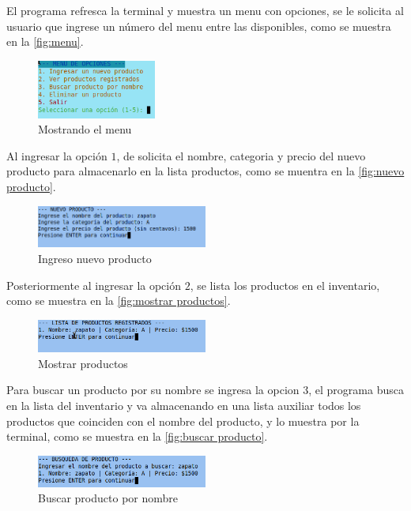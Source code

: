 \documentclass[12pt]{article}
\begin{document}
El programa refresca la terminal y muestra un menu con opciones, se le solicita al usuario que ingrese un número del menu entre las disponibles, como se muestra en la \autoref{fig:menu}.

\begin{figure}[H]
	\centering
	\setlength{\fboxrule}{0pt}
	\includegraphics[width=0.35\textwidth]{Imagenes/menu.png}
	\caption{Mostrando el menu}
	\label{fig:menu}
\end{figure} 

Al ingresar la opción $1$, de solicita el nombre, categoria y precio del nuevo producto para almacenarlo en la lista productos, como se muentra en la \autoref{fig:nuevo producto}.

\begin{figure}[H]
	\centering
	\setlength{\fboxrule}{0pt}
	\includegraphics[width=0.5\textwidth]{Imagenes/img2.png}
	\caption{Ingreso nuevo producto}
	\label{fig:nuevo producto}
\end{figure} 

Posteriormente al ingresar la opción $2$, se lista los productos en el inventario, como se muestra en la \autoref{fig:mostrar productos}.

\begin{figure}[H]
	\centering
	\setlength{\fboxrule}{0pt}
	\includegraphics[width=0.5\textwidth]{Imagenes/img3.png}
	\caption{Mostrar productos}
	\label{fig:mostrar productos}
\end{figure} 

Para buscar un producto por su nombre se ingresa la opcion $3$, el programa busca en la lista del inventario y va almacenando en una lista auxiliar todos los productos que coinciden con el nombre del producto, y lo muestra por la terminal, como se muestra en la \autoref{fig:buscar producto}.

\begin{figure}[H]
	\centering
	\setlength{\fboxrule}{0pt}
	\includegraphics[width=0.5\textwidth]{Imagenes/img4.png}
	\caption{Buscar producto por nombre}
	\label{fig:buscar producto}
\end{figure} 
\end{document}
